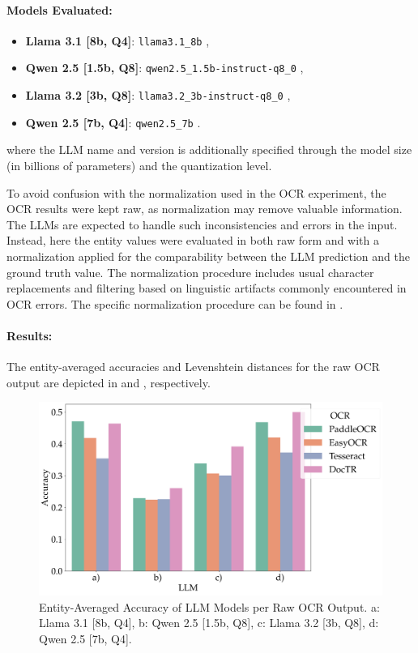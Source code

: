 \documentclass[11pt]{article}
\begin{document}
\paragraph{Models Evaluated:}
\begin{itemize}
    \item \textbf{Llama 3.1 [8b, Q4]}: \texttt{llama3.1\_8b} \cite{touvron2023},
    \item \textbf{Qwen 2.5 [1.5b, Q8]}: \texttt{qwen2.5\_1.5b-instruct-q8\_0} \cite{qwen2025},
    \item \textbf{Llama 3.2 [3b, Q8]}: \texttt{llama3.2\_3b-instruct-q8\_0} \cite{touvron2023},
    \item \textbf{Qwen 2.5 [7b, Q4]}: \texttt{qwen2.5\_7b} \cite{qwen2025}.
\end{itemize}
where the LLM name and version is additionally specified through the model size (in billions of parameters) and the quantization level.

To avoid confusion with the normalization used in the OCR experiment, the OCR results were kept raw, as normalization may remove valuable information. The LLMs are expected to handle such inconsistencies and errors in the input. Instead, here the entity values were evaluated in both raw form and with a normalization applied for the comparability between the LLM prediction and the ground truth value. The normalization procedure includes usual character replacements and filtering based on linguistic artifacts commonly encountered in OCR errors. The specific normalization procedure can be found in .
\paragraph{Results:}
The entity-averaged accuracies and Levenshtein distances for the raw OCR output are depicted in   and , respectively.

\begin{figure}[h!]
    \centering
    \includegraphics[width=0.8\linewidth]{figures/avg_accuracies.png}
    \caption{Entity-Averaged Accuracy of LLM Models per Raw OCR Output. a: Llama 3.1 [8b, Q4], b: Qwen 2.5 [1.5b, Q8], c: Llama 3.2 [3b, Q8], d: Qwen 2.5 [7b, Q4].}
    \label{fig:eval_ocr_llm_accuracies_avg}
\end{figure}
\end{document}
